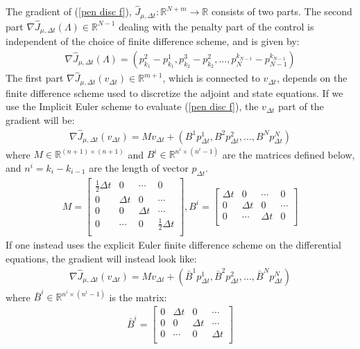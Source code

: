 \begin{theorem}
The gradient of (\ref{pen disc f}), $\hat J_{\mu,\Delta t}:\mathbb{R}^{N+m}\rightarrow\mathbb{R}$ consists of two parts. The second part $ \nabla\hat J_{\mu,\Delta t}(\Lambda)\in\mathbb{R}^{N-1}$ dealing with the penalty part of the control is independent of the choice of finite difference scheme, and is given by:
\begin{align}
\nabla\hat J_{\mu,\Delta t}(\Lambda) = (p_{k_1}^{2}-p_{k_1}^{1},p_{k_2}^{3}-p_{k_2}^{2},...,p_{N}^{k_{N-1}}-p_{N-1}^{k_{N-1}}) \label{num_pen_grad_lam}
\end{align} 
The first part $ \nabla\hat J_{\mu,\Delta t}(v_{\Delta t})\in\mathbb{R}^{m+1}$, which is connected to $v_{\Delta t}$, depends on the finite difference scheme used to discretize the adjoint and state equations. If we use the Implicit Euler scheme to evaluate (\ref{pen disc f}), the $v_{\Delta t}$ part of the gradient will be:
\begin{align}
\nabla\hat J_{\mu,\Delta t}(v_{\Delta t})= Mv_{\Delta t} + (B^1p_{\Delta t}^1,B^2p_{\Delta t}^2,...,B^Np_{\Delta t}^N) \label{num_pen_grad_v}
\end{align}
where $M\in \mathbb{R}^{(n+1)\times (n+1)}$ and $B^i\in \mathbb{R}^{n^i\times (n^i-1)}$ are the matrices defined below, and $n^i=k_i-k_{i-1}$ are the length of vector $p_{\Delta t}$.
\begin{align*}
M=\left[ \begin{array}{cccc}
   \frac{1}{2}\Delta t & 0 & \cdots & 0 \\  
   0& \Delta t & 0 & \cdots \\ 
   0 &0 & \Delta t  & \cdots \\
   0 &\cdots &0 & \frac{1}{2}\Delta t   \\
   \end{array}  \right] 
,B^i = \left[ \begin{array}{cccc}  
   \Delta t& 0 & \cdots & 0 \\ 
   0 & \Delta t& 0  & \cdots \\
   0 &\cdots & \Delta t& 0   \\
   \end{array}  \right] 
\end{align*}
If one instead uses the explicit Euler finite difference scheme on the differential equations, the gradient will instead look like:
\begin{align}
\nabla\hat J_{\mu,\Delta t}(v_{\Delta t})= Mv_{\Delta t} + (\bar B^1p_{\Delta t}^1,\bar B^2p_{\Delta t}^2,...,\bar B^Np_{\Delta t}^N)
\end{align}
where $\bar B^i\in \mathbb{R}^{n^i\times (n^i-1)}$ is the matrix:
\begin{align*}
\bar B^i = \left[ \begin{array}{cccc}  
   0 &\Delta t& 0 & \cdots  \\ 
   0 &0 & \Delta t  & \cdots \\
   0 &\cdots &  0& \Delta t   \\
   \end{array}  \right] 
\end{align*}
\end{theorem}
